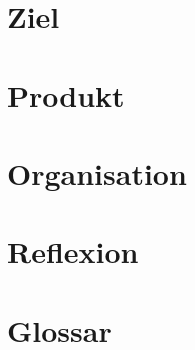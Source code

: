 \documentclass[11pt, oneside, a4paper]{book}
\begin{document}
\pagestyle{empty}

\frontmatter


\tableofcontents

\mainmatter

\part{Ziel}





\part{Produkt}




\part{Organisation}




\part{Reflexion}




\part{Glossar}


% 

\glsaddall
\printglossary
\newpage


\nocite{*}



\end{document}
